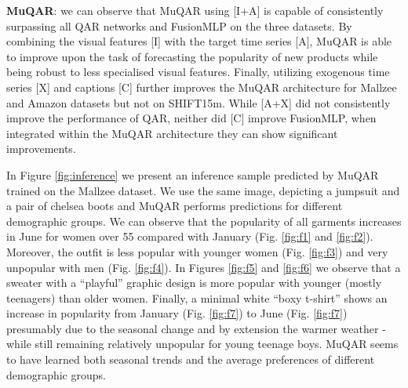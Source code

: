 \documentclass{article}
\begin{document}
\textbf{MuQAR}: we can observe that MuQAR using [I+A] is capable of consistently surpassing all QAR networks and FusionMLP on the three datasets.
By combining the visual features [I] with the target time series [A], MuQAR is able to improve upon the task of forecasting the popularity of new products while being robust to less specialised visual features. 
Finally, utilizing exogenous time series [X] and captions [C] further improves the MuQAR architecture for Mallzee and Amazon datasets but not on SHIFT15m. 
While [A+X] did not consistently improve the performance of QAR, neither did [C] improve FusionMLP, when integrated within the MuQAR architecture they can show significant improvements.

In Figure \ref{fig:inference} we present an inference sample predicted by MuQAR trained on the Mallzee dataset. We use the same image, depicting a jumpsuit and a pair of chelsea boots and MuQAR performs predictions for different demographic groups. We can observe that the popularity of all garments increases in June for women over 55 compared with January (Fig. \ref{fig:f1} and \ref{fig:f2}). Moreover, the outfit is less popular with younger women (Fig. \ref{fig:f3}) and very unpopular with men (Fig. \ref{fig:f4}). 
In Figures \ref{fig:f5} and \ref{fig:f6} we observe that a sweater with a ``playful'' graphic design is more popular with younger (mostly teenagers) than older women.
Finally, a minimal white ``boxy t-shirt'' shows an increase in popularity from January (Fig. \ref{fig:f7}) to June (Fig. \ref{fig:f7}) presumably due to the seasonal change and by extension the warmer weather - while still remaining relatively unpopular for young teenage boys.
MuQAR seems to have learned both seasonal trends and the average preferences of different demographic groups. 
\end{document}
